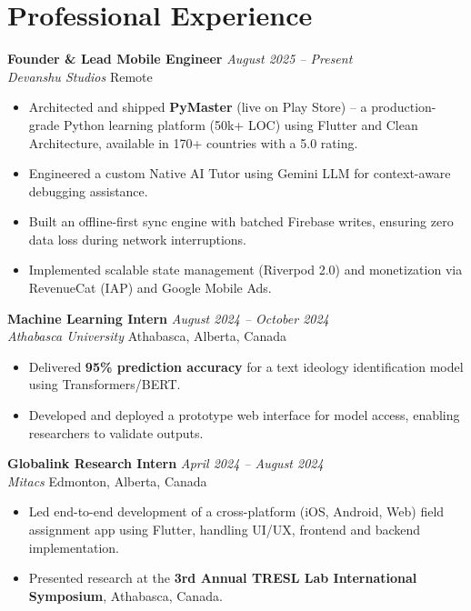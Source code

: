 \documentclass[10pt, letterpaper]{article}
\begin{document}
\section{Professional Experience}

\textbf{Founder \& Lead Mobile Engineer} \hfill \textit{August 2025 -- Present} \\
\textit{Devanshu Studios} \hfill Remote
\begin{itemize}[leftmargin=*, noitemsep, topsep=2pt]
    \item Architected and shipped \textbf{PyMaster} (live on Play Store) -- a production-grade Python learning platform (50k+ LOC) using Flutter and Clean Architecture, available in 170+ countries with a 5.0\bigstar{} rating.
    \item Engineered a custom Native AI Tutor using Gemini LLM for context-aware debugging assistance.
    \item Built an offline-first sync engine with batched Firebase writes, ensuring zero data loss during network interruptions.
    \item Implemented scalable state management (Riverpod 2.0) and monetization via RevenueCat (IAP) and Google Mobile Ads.
\end{itemize}

\vspace{4pt}
\textbf{Machine Learning Intern} \hfill \textit{August 2024 -- October 2024} \\
\textit{Athabasca University} \hfill Athabasca, Alberta, Canada
\begin{itemize}[leftmargin=*, noitemsep, topsep=2pt]
    \item Delivered \textbf{95\% prediction accuracy} for a text ideology identification model using Transformers/BERT.
    \item Developed and deployed a prototype web interface for model access, enabling researchers to validate outputs.
\end{itemize}

\vspace{4pt}
\textbf{Globalink Research Intern} \hfill \textit{April 2024 -- August 2024} \\
\textit{Mitacs} \hfill Edmonton, Alberta, Canada
\begin{itemize}[leftmargin=*, noitemsep, topsep=2pt]
    \item Led end-to-end development of a cross-platform (iOS, Android, Web) field assignment app using Flutter, handling UI/UX, frontend and backend implementation.
    \item Presented research at the \textbf{3rd Annual TRESL Lab International Symposium}, Athabasca, Canada.
\end{itemize}
\end{document}
